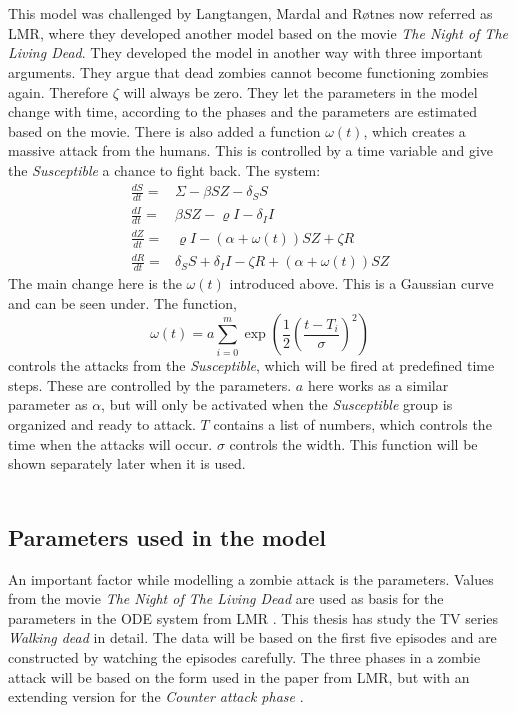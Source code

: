 \documentclass[%
twoside,                 %
final,                   %
10pt]{article}
\begin{document}
\noindent
\\
\\
This model was challenged by Langtangen, Mardal and Røtnes\cite{zombie-math} now referred as LMR, where they developed another model based on the movie \emph{The Night of The Living Dead}. They developed the model in another way with three important arguments. They argue that dead zombies cannot become functioning zombies again. Therefore $\zeta$ will always be zero. They let the parameters in the model change with time, according to the phases and the parameters are estimated based on the movie. There is also added a function $\omega(t)$, which creates a massive attack from the humans. This is controlled by a time variable and give the \emph{Susceptible} a chance to fight back. The system:
\begin{align*} \label{eq: LMR_model}
\frac{dS}{dt} =& \Sigma -\beta SZ - \delta_SS \\
\frac{dI}{dt} =& \beta SZ - \varrho I - \delta_II\\
\frac{dZ}{dt} =& \varrho I- (\alpha+\omega(t))SZ + \zeta R\\
\frac{dR}{dt} =& \delta_SS +\delta_II -\zeta R + (\alpha+\omega(t))SZ 
\end{align*}
The main change here is the $\omega(t)$ introduced above. This is a Gaussian curve and can be seen under. The function,
\begin{equation}
\omega(t) = a \sum^m_{i=0}\exp\left(\frac{1}{2}\left(\frac{t-T_i}{\sigma}\right)^2\right)
\end{equation}
controls the attacks from the \emph{Susceptible}, which will be fired at predefined time steps. These are controlled by the parameters. $a$ here works as a similar parameter as $\alpha$, but will only be activated when the \emph{Susceptible} group is organized and ready to attack. $T$ contains a list of numbers, which controls the time when the attacks will occur. $\sigma$ controls the width. This function will be shown separately later when it is used.
\\
\\
\subsection{Parameters used in the model}
An important factor while modelling a zombie attack is the parameters. Values from the movie \emph{The Night of The Living Dead} are used as basis for the parameters in the ODE system from LMR \cite{zombie-math}. This thesis has study the TV series \emph{Walking dead} in detail. The data will be based on the first five episodes and are constructed by watching the episodes carefully. The three phases in a zombie attack will be based on the form used in the paper from LMR, but with an extending version for the \emph{Counter attack phase} .
\end{document}
